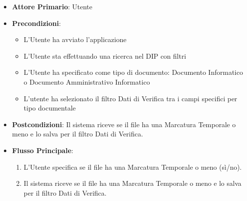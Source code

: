 \label{addValoreMarcaturaTemporalePresente}
\begin{itemize}
      \item \textbf{Attore Primario}: Utente
      \item \textbf{Precondizioni}: 
      \begin{itemize}
            \item L'Utente ha avviato l'applicazione
            \item L'Utente sta effettuando una ricerca nel DIP con filtri
            \item L'Utente ha specificato come tipo di documento: Documento Informatico o Documento Amministrativo Informatico
            \item L'utente ha selezionato il filtro Dati di Verifica tra i campi specifici per tipo documentale
      \end{itemize}
      \item \textbf{Postcondizioni}: Il sistema riceve se il file ha una Marcatura Temporale o meno e lo salva per il filtro Dati di Verifica.
      \item \textbf{Flusso Principale}:
      \begin{enumerate}
            \item L'Utente specifica se il file ha una Marcatura Temporale o meno (sì/no).
            \item Il sistema riceve se il file ha una Marcatura Temporale o meno e lo salva per il filtro Dati di Verifica.
      \end{enumerate}
\end{itemize}


